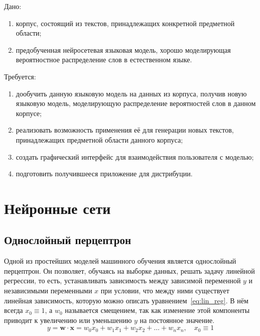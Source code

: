 Дано:
\begin{enumerate}
    \item корпус, состоящий из текстов, принадлежащих конкретной предметной области;
    \item предобученная нейросетевая языковая модель, хорошо моделирующая вероятностное распределение слов в естественном языке.
\end{enumerate}
Требуется:
\begin{enumerate}
    \item дообучить данную языковую модель на данных из корпуса, получив новую языковую модель, моделирующую распределение вероятностей слов в данном корпусе;
    \item реализовать возможность применения её для генерации новых текстов, принадлежащих предметной области данного корпуса;
    \item создать графический интерфейс для взаимодействия пользователя с моделью;
    \item подготовить получившееся приложение для дистрибуции.
\end{enumerate}

\section{Нейронные сети}

\subsection{Однослойный перцептрон}

Одной из простейших моделей машинного обучения является однослойный перцептрон. Он позволяет, обучаясь на выборке данных, решать задачу линейной регрессии, то есть, устанавливать зависимость между зависимой переменной $y$ и независимыми переменными $x$ при условии, что между ними существует линейная зависимость, которую можно описать уравнением \ref*{eq:lin_reg}. В нём всегда $x_0\equiv 1$, а $w_0$ называется смещением, так как изменение этой компоненты приводит к увеличению или уменьшению $y$ на постоянное значение.
\begin{equation}
    \label{eq:lin_reg}
    y=\mathbf{w}\cdot\mathbf{x}=w_0x_0+w_1x_1+w_2x_2+\dots+w_nx_n,\quad x_0\equiv 1
\end{equation}

